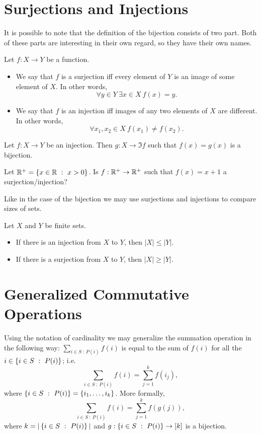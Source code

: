 \section{Surjections and Injections}

It is possible to note that the definition of the bijection consists of two part.
Both of these parts are interesting in their own regard, so they have their own
names.
\begin{definition}
  Let $f : X \to Y$ be a function.
  \begin{itemize}
    \item We say that $f$ is a surjection iff every element of $Y$ is an image
      of some element of $X$. In other words,
      \[
          \forall y \in Y~\exists x \in X\ f(x) = y.
      \]
    \item We say that $f$ is an injection iff images of any two elements
      of $X$ are different. In other words,
      \[
          \forall x_1, x_2 \in X\ f(x_1) \neq f(x_2).
      \]
  \end{itemize}
\end{definition}

\begin{remark}
  Let $f : X \to Y$ be an injection. Then $g : X \to \Im f$ such that
  $f(x) = g(x)$ is a bijection.
\end{remark}

\begin{exercise}
  Let $\R^+ = \set[x > 0]{x \in \R}$. Is $f : \mathbb{R}^+ \to \mathbb{R}^+$ such that
  $f(x) = x + 1$ a surjection/injection?
\end{exercise}

Like in the case of the bijection we may use surjections and injections to
compare sizes of sets.
\begin{theorem}
\label{theorem:injections-surjections-inequalities}
  Let $X$ and $Y$ be finite sets.
  \begin{itemize}
    \item If there is an injection from $X$ to $Y$, then $|X| \le |Y|$.
    \item If there is a surjection from $X$ to $Y$, then $|X| \ge |Y|$.
  \end{itemize}
\end{theorem}

\section{Generalized Commutative Operations}
Using the notation of cardinality we may generalize the summation operation in
the following way: $\sum_{i \in S ~:~ P(i)} f(i)$ is equal to the sum of
$f(i)$ for all the $i \in \set[P(i)]{i \in S}$; i.e.
\[
  \sum_{i \in S ~:~ P(i)} f(i) = \sum_{j = 1}^k f(i_j),
\] where $\set[P(i)]{i \in S} = \set{i_1, \dots, i_k}$. More formally,
\[
  \sum_{i \in S ~:~ P(i)} f(i) = \sum_{j = 1}^k f(g(j)),
\]
where $k = |\set[P(i)]{i \in S}|$ and $g : \set[P(i)]{i \in S} \to [k]$ is a
bijection.

